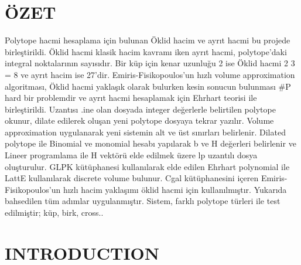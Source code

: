 \documentclass[12pt,twoside]{article}
\begin{document}
\section*{\"OZET}
Polytope hacmi hesaplama için bulunan Öklid hacim ve ayrıt hacmi bu projede
birleştirildi. Öklid hacmi klasik hacim kavramı iken ayrıt hacmi, polytope'daki
integral noktalarının sayısıdır. Bir küp için kenar uzunluğu 2 ise Öklid hacmi 2 3 = 8
ve ayrıt hacim ise 27'dir.\newline \newline
Emiris-Fisikopoulos'un hızlı volume approximation algoritması, Öklid hacmi
yaklaşık olarak bulurken kesin sonucun bulunması \#P hard bir problemdir ve ayrıt
hacmi hesaplamak için Ehrhart teorisi ile birleştirildi. Uzantısı .ine olan dosyada
integer değerlerle belirtilen polytope okunur, dilate edilerek oluşan yeni polytope
dosyaya tekrar yazılır. Volume approximation uygulanarak yeni sistemin alt ve üst
sınırları belirlenir. Dilated polytope ile Binomial ve monomial hesabı yapılarak b ve
H değerleri belirlenir ve Lineer programlama ile H vektörü elde edilmek üzere lp
uzantılı dosya oluşturulur. GLPK kütüphanesi kullanılarak elde edilen Ehrhart
polynomial ile LattE kullanılarak discrete volume bulunur.\newline \newline
Cgal kütüphanesini içeren Emiris-Fisikopoulos'un hızlı hacim yaklaşımı öklid hacmi
için kullanılmıştır. Yukarıda bahsedilen tüm adımlar uygulanmıştır. Sistem, farklı
polytope türleri ile test edilmiştir; küp, birk, cross..
\newpage
\section{INTRODUCTION}
\end{document}
